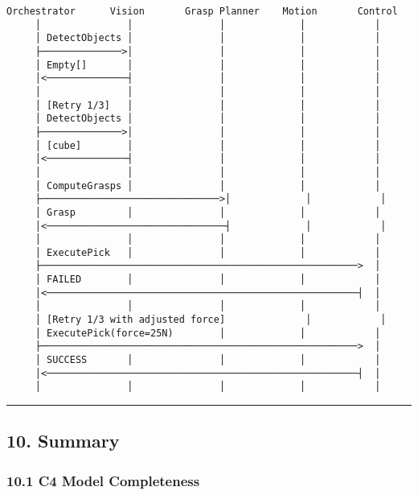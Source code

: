 \documentclass[
]{article}
\begin{document}
\begin{verbatim}
Orchestrator      Vision       Grasp Planner    Motion       Control
     │               │               │             │            │
     │ DetectObjects │               │             │            │
     ├──────────────>│               │             │            │
     │ Empty[]       │               │             │            │
     │<──────────────┤               │             │            │
     │               │               │             │            │
     │ [Retry 1/3]   │               │             │            │
     │ DetectObjects │               │             │            │
     ├──────────────>│               │             │            │
     │ [cube]        │               │             │            │
     │<──────────────┤               │             │            │
     │               │               │             │            │
     │ ComputeGrasps │               │             │            │
     ├───────────────────────────────>│             │            │
     │ Grasp         │               │             │            │
     │<───────────────────────────────┤             │            │
     │               │               │             │            │
     │ ExecutePick   │               │             │            │
     ├───────────────────────────────────────────────────────>  │
     │ FAILED        │               │             │            │
     │<──────────────────────────────────────────────────────┤  │
     │               │               │             │            │
     │ [Retry 1/3 with adjusted force]              │            │
     │ ExecutePick(force=25N)        │             │            │
     ├───────────────────────────────────────────────────────>  │
     │ SUCCESS       │               │             │            │
     │<──────────────────────────────────────────────────────┤  │
     │               │               │             │            │
\end{verbatim}

\begin{center}\rule{0.5\linewidth}{0.5pt}\end{center}

\hypertarget{summary}{%
\subsection{10. Summary}\label{summary}}

\hypertarget{c4-model-completeness}{%
\subsubsection{10.1 C4 Model Completeness}\label{c4-model-completeness}}
\end{document}
